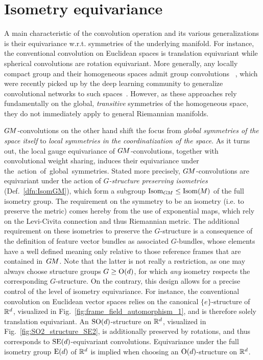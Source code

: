 

\section{Isometry equivariance}
\label{sec:isometry_intro}


A main characteristic of the convolution operation and its various generalizations is their equivariance w.r.t. symmetries of the underlying manifold.
For instance, the conventional convolution on Euclidean spaces is translation equivariant while spherical convolutions are rotation equivariant.
More generally, any locally compact group and their homogeneous spaces admit group convolutions%
~\cite{gurarie1992symmetries,kowalski2010introduction,chirikjian2001engineering,gallier2019harmonicRepr},
which were recently picked up by the deep learning community to generalize convolutional networks to such spaces~\cite{Cohen2016-GCNN,Kondor2018-GENERAL,Cohen2019-generaltheory,bekkers2020bspline}.
However, as these approaches rely fundamentally on the global, \emph{transitive} symmetries of the homogeneous space, they do not immediately apply to general Riemannian manifolds.

$G\mkern-1.4muM$-convolutions on the other hand shift the focus from \emph{global symmetries of the space itself} to \emph{local symmetries in the coordinatization of the space}.
As it turns out, the local gauge equivariance of $G\mkern-1.4muM$-convolutions, together with convolutional weight sharing, induces their equivariance under \mbox{the action of global symmetries.}
Stated more precisely, $G\mkern-1.4muM$-convolutions are equivariant under the action of \emph{$G$-structure preserving isometries} (Def.~\ref{dfn:IsomGM}), which form a subgroup $\operatorname{Isom}_{G\mkern-1.4muM} \leq \operatorname{Isom}(\mkern-1.5mu M \mkern-.5mu)$ of the full isometry group.
The requirement on the symmetry to be an isometry (i.e. to preserve the metric) comes hereby from the use of exponential maps, which rely on the Levi-Civita connection and thus Riemannian metric.
The additional requirement on these isometries to preserve the $G$-structure is a consequence of the definition of feature vector bundles as associated $G$-bundles, whose elements have a well defined meaning only relative to those reference frames that are contained in~$G\mkern-1.4muM$.
Note that the latter is not really a restriction, as one may always choose structure groups $G\geq\operatorname{O}(d)$, for which \emph{any} isometry respects the corresponding $G$-structure.
On the contrary, this design allows for a precise control of the level of isometry equivariance.
For instance, the conventional convolution on Euclidean vector spaces relies on the canonical $\{e\}$-structure of $\mathbb{R}^d$, visualized in Fig.~\ref{fig:frame_field_automorphism_1}, and is therefore solely translation equivariant.
An $\operatorname{SO}(d)$-structure on $\mathbb{R}^d$, visualized in Fig.~\ref{fig:SO2_structure_SE2}, is additionally preserved by rotations, and thus corresponds to $\operatorname{SE}(d)$-equivariant convolutions.
Equivariance under the full isometry group $\operatorname{E}(d)$ of $\mathbb{R}^d$ is implied when choosing an $\operatorname{O}(d)$-structure on $\mathbb{R}^d$.


